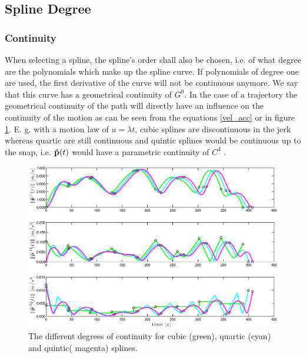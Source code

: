 \subsection{Spline Degree}

\subsubsection{Continuity}
When selecting a spline, the spline's order shall also be chosen, i.e. of what degree are the polynomials which make up the spline curve. If polynomials of degree one are used, the first derivative of the curve will not be continuous anymore. We say that this curve has a geometrical continuity of $G^0$. In the case of a trajectory the geometrical continuity of the path will directly have an influence on the continuity of the motion as can be seen from the equations \eqref{vel_acc} or in figure \ref{fig:continuity}. E. g. with a motion law of $u=\lambda t$, cubic splines are discontinuous in the jerk whereas quartic are still continuous and quintic splines would be continuous up to the snap, i.e. ${\bf \tilde{p}}(t)$ would have a parametric continuity of $C^4$ . 

\begin{figure}[H]
	\centering
    \includegraphics[width = \textwidth]{graphics/continuity.eps}
  \caption{The different degrees of continuity for cubic (green), quartic (cyan) and quintic( magenta) splines.}
  \label{fig:continuity}
\end{figure}



